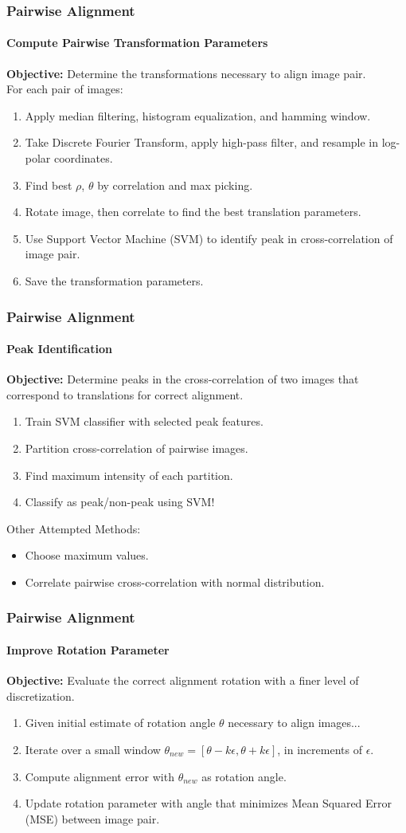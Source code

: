 \documentclass{beamer}
\begin{document}
\begin{frame}
\frametitle{Pairwise Alignment}
\framesubtitle{Compute Pairwise Transformation Parameters}
\textbf{Objective:} Determine the transformations necessary to align image pair. \\
For each pair of images:
\begin{enumerate}
\item Apply median filtering, histogram equalization, and hamming window. 
\item Take Discrete Fourier Transform, apply high-pass filter, and resample in log-polar coordinates. 
\item Find best $\rho$, $\theta$ by correlation and max picking. 
\item Rotate image, then correlate to find the best translation parameters.
\item Use Support Vector Machine (SVM) to identify peak in cross-correlation of image pair. 
\item Save the transformation parameters.
\end{enumerate}
\end{frame}

\begin{frame}
\frametitle{Pairwise Alignment}
\framesubtitle{Peak Identification}
\textbf{Objective:} Determine peaks in the cross-correlation of two images that correspond to translations for correct alignment. \\
\begin{enumerate}
\item Train SVM classifier with selected peak features. 
\item Partition cross-correlation of pairwise images. 
\item Find maximum intensity of each partition. 
\item Classify as peak/non-peak using SVM! 
\end{enumerate}
Other Attempted Methods:
\begin{itemize}
\item Choose maximum values.
\item Correlate pairwise cross-correlation with normal distribution. 
\end{itemize}
\end{frame}

\begin{frame}
\frametitle{Pairwise Alignment}
\framesubtitle{Improve Rotation Parameter} 
\textbf{Objective:} Evaluate the correct alignment rotation with a finer level of discretization. 
\begin{enumerate}
\item Given initial estimate of rotation angle $\theta$ necessary to align images...
\item Iterate over a small window $\theta_{new} = [\theta-k\epsilon, \theta+k\epsilon]$, in increments of $\epsilon$.
\item Compute alignment error with $\theta_{new}$ as rotation angle.
\item Update rotation parameter with angle that minimizes Mean Squared Error (MSE) between image pair.
\end{enumerate}
\end{frame}
\end{document}
